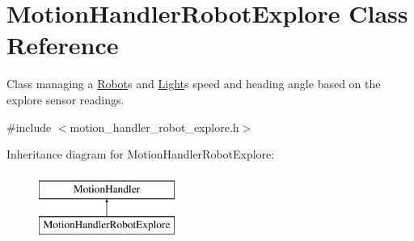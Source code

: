 \hypertarget{class_motion_handler_robot_explore}{}\section{Motion\+Handler\+Robot\+Explore Class Reference}
\label{class_motion_handler_robot_explore}


Class managing a \hyperlink{class_robot}{Robot}\textquotesingle{}s and \hyperlink{class_light}{Light}\textquotesingle{}s speed and heading angle based on the explore sensor readings.  




{\ttfamily \#include $<$motion\+\_\+handler\+\_\+robot\+\_\+explore.\+h$>$}

Inheritance diagram for Motion\+Handler\+Robot\+Explore\+:\begin{figure}[H]
\begin{center}
\leavevmode
\includegraphics[height=2.000000cm]{class_motion_handler_robot_explore}
\end{center}
\end{figure}
